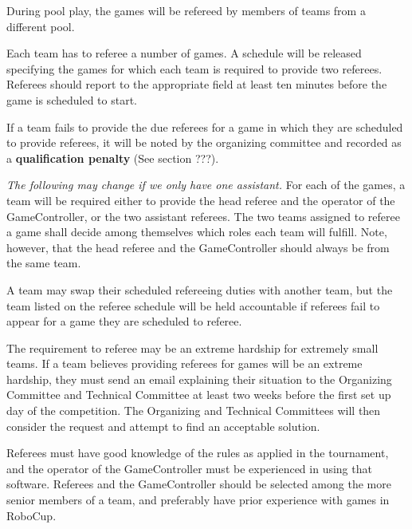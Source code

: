 During pool play, the games will be refereed by members of teams from a different pool.

Each team has to referee a number of games.
A schedule will be released specifying the games for which each team is required to provide two referees.
Referees should report to the appropriate field at least ten minutes before the game is scheduled to start.

If a team fails to provide the due referees for a game in which they are scheduled to provide referees, it will be noted by the organizing committee and recorded as a \textbf{qualification penalty} (See section ???).

\textit{The following may change if we only have one assistant.}
For each of the games, a team will be required either to provide the head referee and the operator of the GameController, or the two assistant referees.
The two teams assigned to referee a game shall decide among themselves which roles each team will fulfill.
Note, however, that the head referee and the GameController should always be from the same team.

A team may swap their scheduled refereeing duties with another team, but the team listed on the referee schedule will be held accountable if referees fail to appear for a game they are scheduled to referee.

The requirement to referee may be an extreme hardship for extremely small teams.
If a team believes providing referees for games will be an extreme hardship, they must send an email explaining their situation to the Organizing Committee and Technical Committee at least two weeks before the first set up day of the competition.
The Organizing and Technical Committees will then consider the request and attempt to find an acceptable solution.

Referees must have good knowledge of the rules as applied in the tournament, and the operator of the GameController must be experienced in using that software.
Referees and the GameController should be selected among the more senior members of a team, and preferably have prior experience with games in RoboCup.


